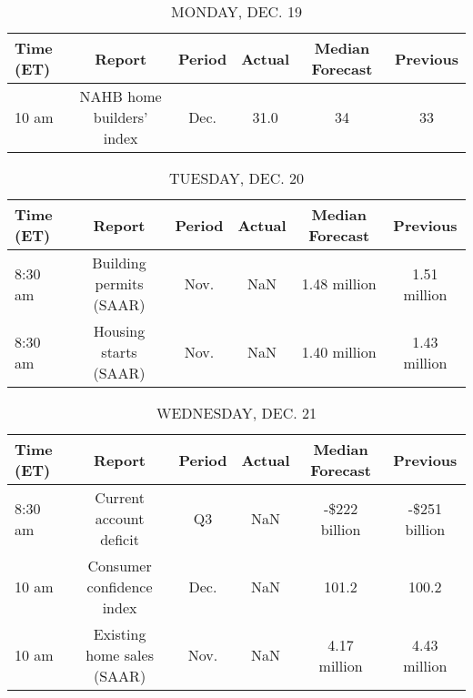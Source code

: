 \documentclass{article}%
\begin{document}
%
\normalsize%


\begin{table}[htbp]%
\caption{MONDAY, DEC. 19}%
\centering%
\begin{adjustbox}{width=1\textwidth}%
\begin{tabular}{lccccc}
\toprule
Time (ET) &                    Report & Period & Actual & Median Forecast & Previous \\
\midrule
    10 am & NAHB home builders' index &   Dec. &   31.0 &              34 &       33 \\
\bottomrule
\end{tabular}
%
\end{adjustbox}%
\end{table}

%


\begin{table}[htbp]%
\caption{TUESDAY, DEC. 20}%
\centering%
\begin{adjustbox}{width=1\textwidth}%
\begin{tabular}{lccccc}
\toprule
Time (ET) &                  Report & Period & Actual & Median Forecast &     Previous \\
\midrule
  8:30 am & Building permits (SAAR) &   Nov. &    NaN &    1.48 million & 1.51 million \\
  8:30 am &   Housing starts (SAAR) &   Nov. &    NaN &    1.40 million & 1.43 million \\
\bottomrule
\end{tabular}
%
\end{adjustbox}%
\end{table}

%


\begin{table}[htbp]%
\caption{WEDNESDAY, DEC. 21}%
\centering%
\begin{adjustbox}{width=1\textwidth}%
\begin{tabular}{lccccc}
\toprule
Time (ET) &                     Report & Period & Actual & Median Forecast &      Previous \\
\midrule
  8:30 am &    Current account deficit &     Q3 &    NaN &   -\$222 billion & -\$251 billion \\
    10 am &  Consumer confidence index &   Dec. &    NaN &           101.2 &         100.2 \\
    10 am & Existing home sales (SAAR) &   Nov. &    NaN &    4.17 million &  4.43 million \\
\bottomrule
\end{tabular}
%
\end{adjustbox}%
\end{table}
\end{document}

